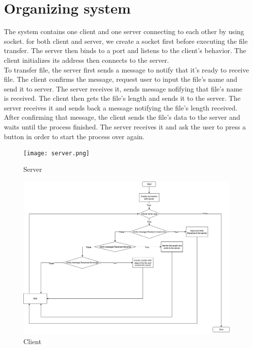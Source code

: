 \documentclass[12pt]{article}
\begin{document}
  \section{Organizing system}
    The system contains one client and one server connecting to each other by using socket. for both client and server, we create a socket first before executing the file transfer. The server then binds to a port and listens to the client's behavior. The client initializes its address then connects to the server. \\
    To transfer file, the server first sends a message to notify that it's ready to receive file. The client confirms the message, request user to input the file's name and send it to server. The server receives it, sends message nofifying that file's name is received. The client then gets the file's length and sends it to the server. The server receives it and sends back a message notifying the file's length received. After confirming that message, the client sends the file's data to the server and waits until the process finished. The server receives it and ask the user to press a button in order to start the process over again.
    \begin{figure}[h]
        \centering
       \texttt{[image: server.png]}
        \caption{Server}
        \includegraphics[height=8.35cm]{client.png}
       \caption{Client}
    \end{figure}
 
\end{document}
